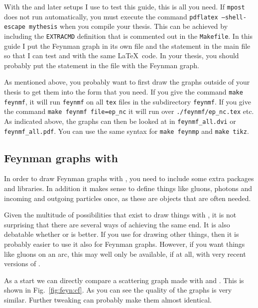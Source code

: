 With the  and later setups I use to test this guide,
this is all you need. If \texttt{mpost} does not run automatically,
you must execute the command \texttt{pdflatex --shell-escape
  mythesis} when you compile your thesis. This can be achieved by
including the \texttt{EXTRACMD} definition that is commented out in
the \texttt{Makefile}. In this guide I put the Feynman graph in its
own file and the  statement in the main file so that
I can test  and  with the same
\LaTeX\ code. In your thesis, you should probably put the
 statement in the file with the Feynman graph.

As mentioned above, you probably want to first draw the graphs outside
of your thesis to get them into the form that you need. If you give
the command \texttt{make feynmf}, it will run \texttt{feynmf} on all
\texttt{tex} files in the subdirectory \texttt{feynmf}. If you give
the command \texttt{make feynmf file=ep\_nc} it will run over
\texttt{./feynmf/ep\_nc.tex} etc. As indicated above, the graphs can
then be looked at in \texttt{feynmf\_all.dvi} or\\
\texttt{feynmf\_all.pdf}. You can use the same syntax for
\texttt{make feynmp} and \texttt{make tikz}.


\subsection{Feynman graphs with \TikZ}
\label{sec:fig:feynman:tikz}

In order to draw Feynman graphs with \TikZ, you need to include some
extra \TikZ packages and libraries. In addition it makes sense to
define things like gluons, photons and incoming and outgoing particles
once, as these are objects that are often needed.

Given the multitude of possibilities that exist to draw things with
\TikZ, it is not surprising that there are several ways of achieving the
same end. It is also debatable whether  or 
is better. If you use \TikZ for drawing other things, then it is
probably easier to use it also for Feynman graphs. However, if you
want things like gluons on an arc, this may well only be available, if
at all, with very recent versions of .

As a start we can directly compare a scattering graph made with
 and . This is shown in
Fig.~\ref{fig:feyn:cf}. As you can see the quality of the graphs is
very similar. Further tweaking can probably make them almost
identical.

